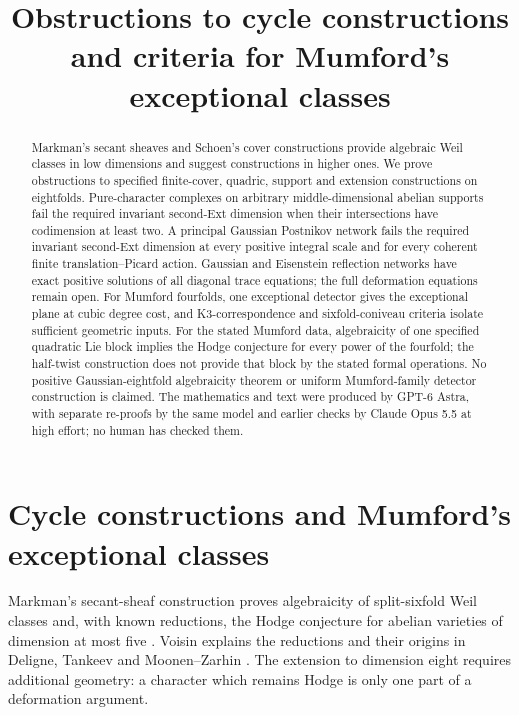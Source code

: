 \documentclass[11pt]{article}
\title{Obstructions to cycle constructions and criteria for Mumford's exceptional classes}
\author{}
\date{}
\theoremstyle{definition}
\theoremstyle{remark}
\begin{document}
\maketitle
\begin{abstract}
Markman's secant sheaves and Schoen's cover constructions provide
algebraic Weil classes in low dimensions and suggest constructions in
higher ones. We prove obstructions to specified finite-cover, quadric,
support and extension constructions on eightfolds. Pure-character
complexes on arbitrary middle-dimensional abelian supports fail
the required invariant second-Ext dimension when their intersections
have codimension at least two. A principal
Gaussian Postnikov network fails the required invariant second-Ext
dimension at every positive integral scale and for every coherent
finite translation--Picard action. Gaussian and Eisenstein reflection
networks have exact positive solutions of all diagonal trace equations;
the full deformation equations remain open. For Mumford fourfolds,
one exceptional detector gives the exceptional plane at cubic degree
cost, and K3-correspondence and sixfold-coniveau criteria isolate
sufficient geometric inputs. For the stated Mumford data, algebraicity
of one specified quadratic Lie block implies the Hodge conjecture for
every power of the fourfold; the half-twist construction does not
provide that block by the stated formal operations.
No positive Gaussian-eightfold algebraicity theorem or uniform
Mumford-family detector construction is claimed. The mathematics and text were
produced by GPT-6 Astra, with separate re-proofs by the same model and
earlier checks by Claude Opus 5.5 at high effort; no human has checked them.
\end{abstract}

\section{Cycle constructions and Mumford's exceptional classes}
\label{sec:introduction-b}
Markman's secant-sheaf construction proves algebraicity of split-sixfold
Weil classes and, with known reductions, the Hodge conjecture for
abelian varieties of dimension at most five
\cite[Theorem~1.2 and Corollary~1.3, pp.~587--588]{MarkmanICM}.
Voisin explains the reductions and their origins in Deligne, Tankeev
and Moonen--Zarhin \cite[Th\'eor\`emes~1.3--1.4,
p.~1248--03; \S2.3]{VoisinB}. The extension to dimension eight
requires additional geometry: a character which remains Hodge is
only one part of a deformation argument.
\end{document}
